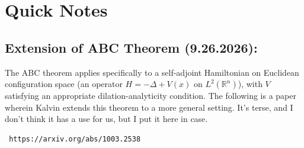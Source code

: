 \documentclass[12pt]{article}
\begin{document}
    \section*{Quick Notes}
    
    \subsection*{Extension of ABC Theorem (9.26.2026):}

    The ABC theorem applies specifically to a self-adjoint Hamiltonian on Euclidean configuration space (an operator $H=-\Delta + V(x)$ on $L^2(\mathbb{R}^n)$), with $V$ satisfying an appropriate dilation-analyticity condition. The following is a paper wherein Kalvin extends this theorem to a more general setting. It's terse, and I don't think it has a use for us, but I put it here in case.
    \begin{verbatim} https://arxiv.org/abs/1003.2538 \end{verbatim}
\end{document}

